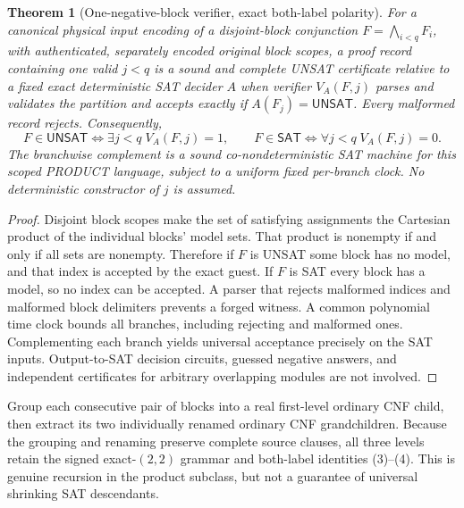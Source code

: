 \documentclass[11pt]{article}
\newtheorem{theorem}{Theorem}
\newcommand{\SAT}{\mathsf{SAT}}
\newcommand{\UNSAT}{\mathsf{UNSAT}}
\begin{document}
\begin{theorem}[One-negative-block verifier, exact both-label polarity]\label{th:negative}
For a canonical physical input encoding of a disjoint-block conjunction $F=\bigwedge_{i<q}F_i$, with authenticated, separately encoded original block scopes, a proof record containing one valid $j<q$ is a sound and complete UNSAT certificate \emph{relative to a fixed exact deterministic SAT decider $A$} when verifier $V_A(F,j)$ parses and validates the partition and accepts exactly if $A(F_j)=\UNSAT$. Every malformed record rejects. Consequently,
\[
F\in\UNSAT\iff\exists j<q\;V_A(F,j)=1,
\qquad
F\in\SAT\iff\forall j<q\;V_A(F,j)=0.\tag{4}
\]
The branchwise complement is a sound co-nondeterministic SAT machine for this scoped PRODUCT language, subject to a uniform fixed per-branch clock. No deterministic constructor of $j$ is assumed.
\end{theorem}
\begin{proof}
Disjoint block scopes make the set of satisfying assignments the Cartesian product of the individual blocks' model sets. That product is nonempty if and only if all sets are nonempty. Therefore if $F$ is UNSAT some block has no model, and that index is accepted by the exact guest. If $F$ is SAT every block has a model, so no index can be accepted. A parser that rejects malformed indices and malformed block delimiters prevents a forged witness. A common polynomial time clock bounds all branches, including rejecting and malformed ones. Complementing each branch yields universal acceptance precisely on the SAT inputs. Output-to-SAT decision circuits, guessed negative answers, and independent certificates for arbitrary overlapping modules are not involved.
\end{proof}

Group each consecutive pair of blocks into a real first-level ordinary CNF child, then extract its two individually renamed ordinary CNF grandchildren. Because the grouping and renaming preserve complete source clauses, all three levels retain the signed exact-$(2,2)$ grammar and both-label identities (3)--(4). This is genuine recursion in the product subclass, but not a guarantee of universal shrinking SAT descendants.
\end{document}
